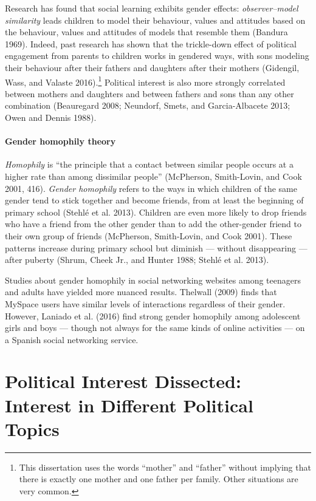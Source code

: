 \documentclass[
  letterpaper,
  DIV=11,
  numbers=noendperiod]{scrreprt}
\let\oldparagraph\paragraph
\renewcommand{\paragraph}[1]{\oldparagraph{#1}\mbox{}}
\begin{document}
Research has found that social learning exhibits gender effects:
\emph{observer--model similarity} leads children to model their
behaviour, values and attitudes based on the behaviour, values and
attitudes of models that resemble them (Bandura 1969). Indeed, past
research has shown that the trickle-down effect of political engagement
from parents to children works in gendered ways, with sons modeling
their behaviour after their fathers and daughters after their mothers
(Gidengil, Wass, and Valaste 2016).\footnote{This dissertation uses the
  words ``mother'' and ``father'' without implying that there is exactly
  one mother and one father per family. Other situations are very
  common.} Political interest is also more strongly correlated between
mothers and daughters and between fathers and sons than any other
combination (Beauregard 2008; Neundorf, Smets, and Garcia-Albacete 2013;
Owen and Dennis 1988).

\hypertarget{gender-homophily-theory}{%
\paragraph{Gender homophily theory}\label{gender-homophily-theory}}

\emph{Homophily} is ``the principle that a contact between similar
people occurs at a higher rate than among dissimilar people''
(McPherson, Smith-Lovin, and Cook 2001, 416). \emph{Gender homophily}
refers to the ways in which children of the same gender tend to stick
together and become friends, from at least the beginning of primary
school (Stehlé et al. 2013). Children are even more likely to drop
friends who have a friend from the other gender than to add the
other-gender friend to their own group of friends (McPherson,
Smith-Lovin, and Cook 2001). These patterns increase during primary
school but diminish --- without disappearing --- after puberty (Shrum,
Cheek Jr., and Hunter 1988; Stehlé et al. 2013).

Studies about gender homophily in social networking websites among
teenagers and adults have yielded more nuanced results. Thelwall (2009)
finds that MySpace users have similar levels of interactions regardless
of their gender. However, Laniado et al. (2016) find strong gender
homophily among adolescent girls and boys --- though not always for the
same kinds of online activities --- on a Spanish social networking
service.

\hypertarget{political-interest-dissected-interest-in-different-political-topics}{%
\section{Political Interest Dissected: Interest in Different Political
Topics}\label{political-interest-dissected-interest-in-different-political-topics}}
\end{document}
